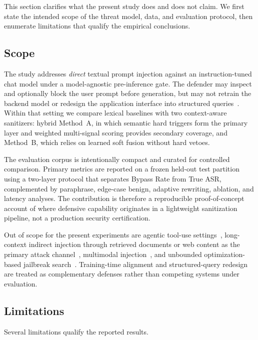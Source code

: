 ﻿\documentclass[10pt]{article}
\begin{document}
This section clarifies what the present study does and does not claim.
We first state the intended scope of the threat model, data, and evaluation protocol, then enumerate limitations that qualify the empirical conclusions.

\subsection{Scope}
\label{sec:scope}

The study addresses \emph{direct} textual prompt injection against an instruction-tuned chat model under a model-agnostic pre-inference gate.
The defender may inspect and optionally block the user prompt before generation, but may not retrain the backend model or redesign the application interface into structured queries~\cite{struq2024,secalign2024}.
Within that setting we compare lexical baselines with two context-aware sanitizers: hybrid Method~A, in which semantic hard triggers form the primary layer and weighted multi-signal scoring provides secondary coverage, and Method~B, which relies on learned soft fusion without hard vetoes.

The evaluation corpus is intentionally compact and curated for controlled comparison.
Primary metrics are reported on a frozen held-out test partition using a two-layer protocol that separates Bypass Rate from True ASR, complemented by paraphrase, edge-case benign, adaptive rewriting, ablation, and latency analyses.
The contribution is therefore a reproducible proof-of-concept account of where defensive capability originates in a lightweight sanitization pipeline, not a production security certification.

Out of scope for the present experiments are agentic tool-use settings~\cite{debenedetti2024agentdojo}, long-context indirect injection through retrieved documents or web content as the primary attack channel~\cite{greshake2023indirect,hines2024spotlighting}, multimodal injection~\cite{yeo2025multimodal}, and unbounded optimization-based jailbreak search~\cite{yi2024jailbreak}.
Training-time alignment and structured-query redesign are treated as complementary defenses rather than competing systems under evaluation.

\subsection{Limitations}
\label{sec:limitations-detail}

Several limitations qualify the reported results.
\end{document}
